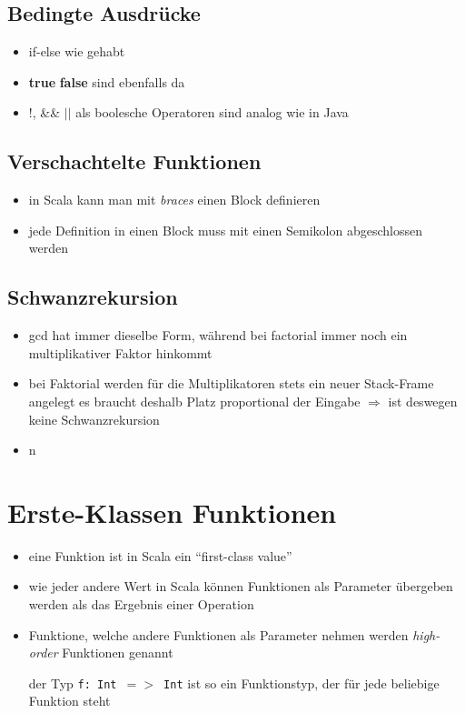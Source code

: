\subsection{Bedingte Ausdrücke}
\begin{itemize}
  \item if-else wie gehabt
  \item \textbf{true} \und \textbf{false} sind ebenfalls da
  \item !, \&\& $||$ als boolesche Operatoren sind analog wie in Java
\end{itemize}


\subsection{Verschachtelte Funktionen}
\begin{itemize}
  \item in Scala kann man mit \textit{braces} einen Block definieren
  \item jede Definition in einen Block muss mit einen Semikolon abgeschlossen
  werden
\end{itemize}


\subsection{Schwanzrekursion}






\begin{itemize}
  \item gcd hat immer dieselbe Form, während bei factorial immer noch ein
  multiplikativer Faktor hinkommt
  \item bei Faktorial werden für die Multiplikatoren stets ein neuer
  Stack-Frame angelegt \und es braucht deshalb Platz proportional der
  Eingabe $\Rightarrow$ ist deswegen keine Schwanzrekursion
  \item n
\end{itemize}
\pagebreak


\section{Erste-Klassen Funktionen}
\begin{itemize}
  \item eine Funktion ist in Scala ein \enquote{first-class value}
  \item wie jeder andere Wert in Scala können Funktionen als Parameter
  übergeben werden \oder als das Ergebnis einer Operation
  \item Funktione, welche andere Funktionen als Parameter nehmen werden
  \textit{high-order} Funktionen genannt
  
  
  
  der Typ \texttt{f: Int $=>$ Int} ist so ein Funktionstyp, der für jede
  beliebige Funktion steht
\end{itemize}


